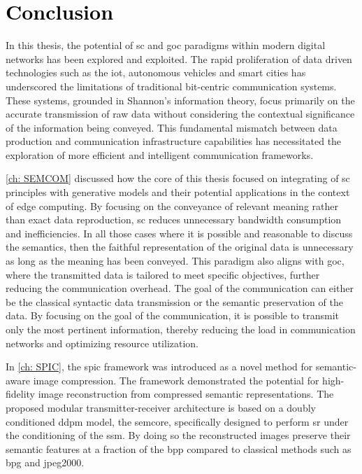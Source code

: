 \chapter{\textcolor{black}{Conclusion}}
\label{ch: Conclusion}
\thispagestyle{plain}

In this thesis, the potential of \gls{sc} and \gls{goc} paradigms within modern digital networks has been explored and exploited. The rapid proliferation of data driven technologies such as the \gls{iot}, autonomous vehicles and smart cities has underscored the limitations of traditional bit-centric communication systems. These systems, grounded in Shannon's information theory, focus primarily on the accurate transmission of raw data without considering the contextual significance of the information being conveyed. This fundamental mismatch between data production and communication infrastructure capabilities has necessitated the exploration of more efficient and intelligent communication frameworks.

\cref{ch: SEMCOM} discussed how the core of this thesis focused on integrating of \gls{sc} principles with generative models and their potential applications in the context of edge computing. By focusing on the conveyance of relevant meaning rather than exact data reproduction, \gls{sc} reduces unnecessary bandwidth consumption and inefficiencies. In all those cases where it is possible and reasonable to discuss the semantics, then the faithful representation of the original data is unnecessary as long as the meaning has been conveyed. This paradigm also aligns with \gls{goc}, where the transmitted data is tailored to meet specific objectives, further reducing the communication overhead. The goal of the communication can either be the classical syntactic data transmission or the semantic preservation of the data. By focusing on the goal of the communication, it is possible to transmit only the most pertinent information, thereby reducing the load in communication networks and optimizing resource utilization.

In \cref{ch: SPIC}, the \gls{spic} framework was introduced as a novel method for semantic-aware image compression. The framework demonstrated the potential for high-fidelity image reconstruction from compressed semantic representations. The proposed modular transmitter-receiver architecture is based on a doubly conditioned \gls{ddpm} model, the \gls{semcore}, specifically designed to perform \gls{sr} under the conditioning of the \gls{ssm}. By doing so the reconstructed images preserve their semantic features at a fraction of the \gls{bpp} compared to classical methods such as \gls{bpg} and \gls{jpeg2000}.

